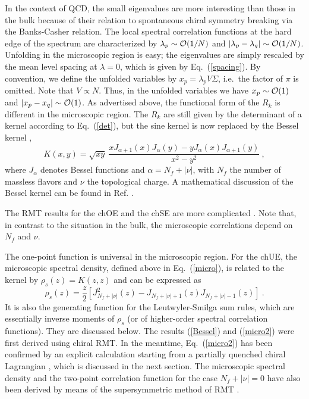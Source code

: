 In the context of QCD, the small eigenvalues are more interesting than
those in the bulk because of their relation to spontaneous chiral
symmetry breaking via the Banks-Casher relation.  The local spectral
correlation functions at the hard edge of the spectrum are
characterized by $\lambda_p\sim{\cal O}(1/N)$ and
$|\lambda_p-\lambda_q|\sim{\cal O}(1/N)$.  Unfolding in the
microscopic region is easy; the eigenvalues are simply rescaled by the
mean level spacing at $\lambda=0$, which is given by
Eq.~(\ref{spacing}).  By convention, we define the unfolded
variables by $x_p=\lambda_p V\Sigma$, i.e.\ the factor of $\pi$ is
omitted.  Note that $V\propto N$.  Thus, in the unfolded variables we
have $x_p\sim{\cal O}(1)$ and $|x_p-x_q|\sim{\cal O}(1)$.  As
advertised above, the functional form of the $R_k$ is different in
the microscopic region.  The $R_k$ are still given by the determinant
of a kernel according to Eq.~(\ref{det}), but the sine kernel is now
replaced by the Bessel kernel \cite{Verb93},
\begin{equation}
  \label{Bessel}
  K(x,y)=\sqrt{xy}\:\frac{xJ_{\alpha+1}(x)J_\alpha(y)
    -yJ_\alpha(x)J_{\alpha+1}(y)}{x^2-y^2}\:,
\end{equation}
where $J_\alpha$ denotes Bessel functions and $\alpha=N_f+|\nu|$,
with $N_f$ 
the number of massless flavors and $\nu$ the topological charge.  A
mathematical discussion of the Bessel kernel can be found in Ref.
\cite{Tracy}.
  
The RMT results for the chOE and the chSE are more complicated
\cite{Verb94,Naga95,Brez96,Altland}.  Note that, in contrast to the
situation in the bulk, the microscopic correlations depend on $N_f$
and $\nu$.

The one-point function is universal in
the microscopic region.  For the chUE, the microscopic spectral
density, defined above in Eq.~(\ref{micro}), is
related to the kernel by $\rho_s(z)=K(z,z)$ and can be expressed as
\cite{Verb93,Verb94c}
\begin{equation}
  \rho_s(z)  = \frac {z}{2} \left[J^2_{N_f+|\nu|}(z) -J_{N_f+|\nu|+1}(z)
  J_{N_f+|\nu|-1}(z)\right]\:.
  \label{micro2} 
\end{equation}
It is also the generating function for the Leutwyler-Smilga sum rules,
which are essentially inverse moments of $\rho_s$ (or of higher-order
spectral correlation functions). They are discussed below.  The
results (\ref{Bessel}) and (\ref{micro2}) were first derived using
chiral RMT.  In the meantime, Eq.~(\ref{micro2}) has been confirmed by
an explicit calculation starting from a partially quenched chiral
Lagrangian \cite{OTV,Damg99}, which is discussed in the next section.  The
microscopic spectral density and the two-point correlation function
for the case $N_f+|\nu|=0$ have also been derived by means of the
supersymmetric method of RMT \cite{Andreev}.

